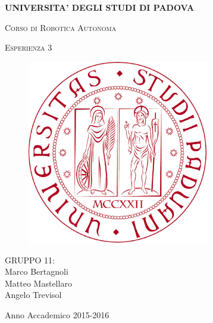 \documentclass[english]{article}
\begin{document}
\begin{titlepage} 

\begin{center}
\begin{Large} \textbf{UNIVERSITA' DEGLI STUDI DI PADOVA} \\
 \end{Large} \vspace{1cm}

\begin{Large} \textsc{Corso di Robotica Autonoma }\end{Large}
\par\end{center}

\begin{center}
\begin{Large}\textsc{Esperienza 3}\\
 \end{Large}
\par\end{center}

\begin{center}
\vspace{2cm}
\begin{figure}[!htb]
\centering \includegraphics[width=8cm]{unipd}\\
 
\end{figure}

\par\end{center}

\begin{center}
\vspace{2cm}
 \begin{Large}
 GRUPPO 11: \\
 Marco Bertagnoli \\ 
 Matteo Mastellaro \\ 
 Angelo Trevisol\\
 \end{Large} \vspace{2cm}
 \begin{Large} Anno Accademico 2015-2016 \end{Large} 
\par\end{center}

\end{titlepage}
\end{document}
